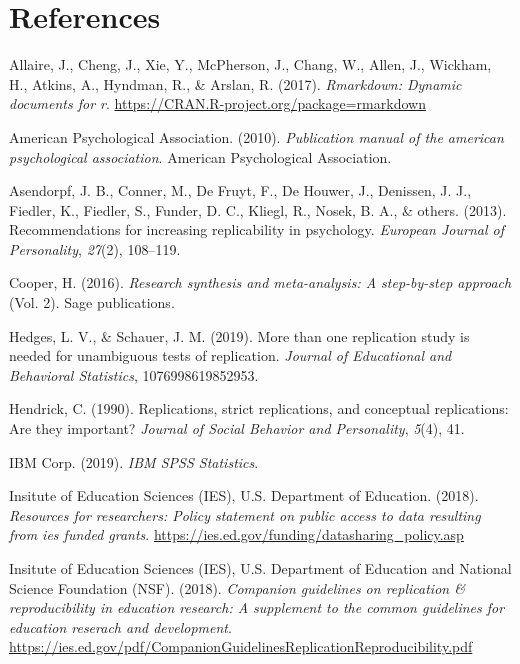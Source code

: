 \documentclass[
  english,
  ,man]{apa7}
\newlength{\cslhangindent}
\newenvironment{cslreferences}%
  {\setlength{\parindent}{0pt}%
  \everypar{\setlength{\hangindent}{\cslhangindent}}\ignorespaces}%
  {\par}
\begin{document}
\newpage

\hypertarget{references}{%
\section{References}\label{references}}

\setlength{\parindent}{-0.5in}
\setlength{\leftskip}{0.5in}

\hypertarget{refs}{}
\begin{cslreferences}
\leavevmode\hypertarget{ref-rmarkdown}{}%
Allaire, J., Cheng, J., Xie, Y., McPherson, J., Chang, W., Allen, J., Wickham, H., Atkins, A., Hyndman, R., \& Arslan, R. (2017). \emph{Rmarkdown: Dynamic documents for r}. \url{https://CRAN.R-project.org/package=rmarkdown}

\leavevmode\hypertarget{ref-apa}{}%
American Psychological Association. (2010). \emph{Publication manual of the american psychological association}. American Psychological Association.

\leavevmode\hypertarget{ref-asendorpf2013}{}%
Asendorpf, J. B., Conner, M., De Fruyt, F., De Houwer, J., Denissen, J. J., Fiedler, K., Fiedler, S., Funder, D. C., Kliegl, R., Nosek, B. A., \& others. (2013). Recommendations for increasing replicability in psychology. \emph{European Journal of Personality}, \emph{27}(2), 108--119.

\leavevmode\hypertarget{ref-cooper2016}{}%
Cooper, H. (2016). \emph{Research synthesis and meta-analysis: A step-by-step approach} (Vol. 2). Sage publications.

\leavevmode\hypertarget{ref-hedges2019}{}%
Hedges, L. V., \& Schauer, J. M. (2019). More than one replication study is needed for unambiguous tests of replication. \emph{Journal of Educational and Behavioral Statistics}, 1076998619852953.

\leavevmode\hypertarget{ref-hendrick1990}{}%
Hendrick, C. (1990). Replications, strict replications, and conceptual replications: Are they important? \emph{Journal of Social Behavior and Personality}, \emph{5}(4), 41.

\leavevmode\hypertarget{ref-spss}{}%
IBM Corp. (2019). \emph{IBM SPSS Statistics}.

\leavevmode\hypertarget{ref-iesdata}{}%
Insitute of Education Sciences (IES), U.S. Department of Education. (2018). \emph{Resources for researchers: Policy statement on public access to data resulting from ies funded grants}. \url{https://ies.ed.gov/funding/datasharing_policy.asp}

\leavevmode\hypertarget{ref-iesrepro}{}%
Insitute of Education Sciences (IES), U.S. Department of Education and National Science Foundation (NSF). (2018). \emph{Companion guidelines on replication \& reproducibility in education research: A supplement to the common guidelines for education reserach and development}. \url{https://ies.ed.gov/pdf/CompanionGuidelinesReplicationReproducibility.pdf}


\end{cslreferences}
\end{document}
